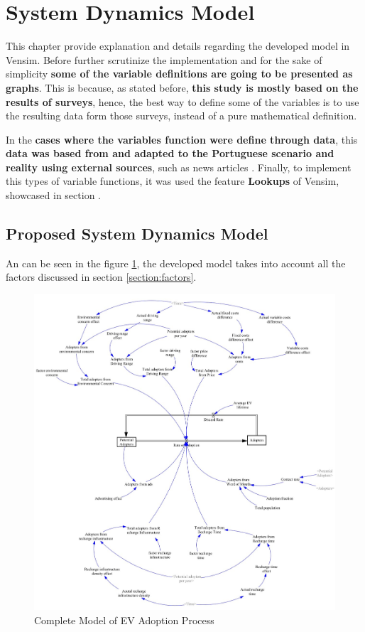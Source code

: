 \section{System Dynamics Model} \label{section:model}
This chapter provide explanation and details regarding the developed model in Vensim. Before further scrutinize the implementation and for the sake of simplicity \textbf{some of the variable definitions are going to be presented as graphs}. This is because, as stated before, \textbf{this study is mostly based on the results of surveys}, hence, the best way to define some of the variables is to use the resulting data form those surveys, instead of a pure mathematical definition.

In the \textbf{cases where the variables function were define through data}, this \textbf{data was based from \cite{thesis-base, pedro-report} and adapted to the Portuguese scenario and reality using external sources}, such as news articles \cite{dv-news-article, eco-news-article, obs-news-article, uve-news-article}. Finally, to implement this types of variable functions, it was used the feature \textbf{Lookups} of Vensim, showcased in section \cite{vensim-youtube-lookups}.

\subsection{Proposed System Dynamics Model}
An can be seen in the figure \ref{fig:vensim-model}, the developed model takes into account all the factors discussed in section \ref{section:factors}.

\begin{figure}[!htbp]
\centerline{\includegraphics[width=0.74\linewidth]{img/vensim-model.jpg}}
\caption{Complete Model of EV Adoption Process}
\label{fig:vensim-model}
\end{figure}

